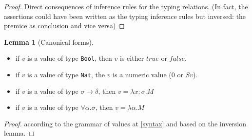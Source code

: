 \documentclass{article}
\newtheorem{lemma}[theorem]{Lemma}
\begin{document}
    \begin{proof}
        Direct consequences of inference rules for the typing relations. (In fact, the assertions could have been written as the typing inference rules but inversed: the premice as conclusion and vice versa)
    \end{proof}
    

    \begin{lemma}[Canonical forms]\label{canocical forms}
    \end{lemma}
    \begin{itemize}
        \item if $v$ is a value of type \texttt{Bool}, then $v$ is either $true$ or $false$.
        \item if $v$ is a value of type \texttt{Nat}, the $v$ is a numeric value ($0$ or $S v$).
        \item if $v$ is a value of type \texttt{$\sigma\rightarrow\delta$}, then $v = \lambda x:\sigma.M$
        \item if $v$ is a value of type \texttt{$\forall\alpha.\sigma$}, then $v = \lambda \alpha.M$
    \end{itemize}

    \begin{proof}
        according to the grammar of values at \ref{syntax} and based on the inversion lemma.
    \end{proof}
        
\end{document}
